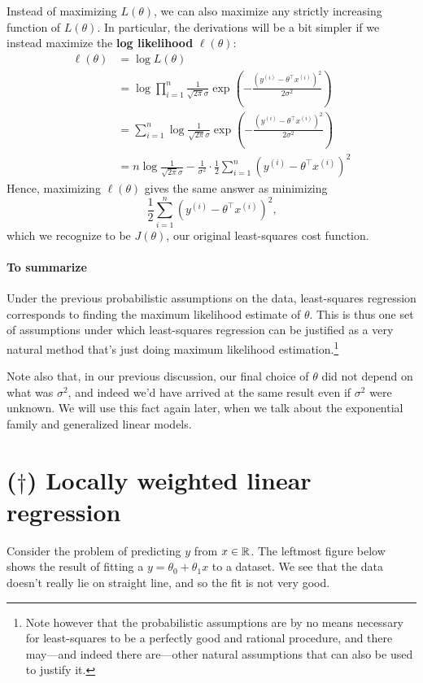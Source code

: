 Instead of maximizing $L(\theta)$, we can also maximize any strictly increasing
function of $L(\theta)$. In particular, the derivations will be a bit simpler if we
instead maximize the \textbf{log likelihood} $\ell(\theta)$:
\begin{align*}
    \ell(\theta) &= \log L(\theta) \\
    &= \log \prod_{i=1}^n \frac{1}{\sqrt{2\pi}\sigma} \exp \left( - \frac{(y^{(i)} - \theta^\top x^{(i)})^2}{2\sigma^2} \right) \\
    &= \sum_{i=1}^n \log \frac{1}{\sqrt{2\pi}\sigma} \exp \left( - \frac{(y^{(i)} - \theta^\top x^{(i)})^2}{2\sigma^2} \right) \\
    &= n \log \frac{1}{\sqrt{2\pi}\sigma} - \frac{1}{\sigma^2} \cdot \frac{1}{2} \sum_{i=1}^n \left(y^{(i)} - \theta^\top x^{(i)} \right)^2 %
\end{align*}
Hence, maximizing $\ell(\theta)$ gives the same answer as minimizing
\begin{equation*}
    \frac 1 2 \sum_{i=1}^n \left( y^{(i)} - \theta^\top x^{(i)} \right)^2\text{,}
\end{equation*}
which we recognize to be $J(\theta)$, our original least-squares cost function.

\paragraph{To summarize} Under the previous probabilistic assumptions on the data,
least-squares regression corresponds to finding the maximum likelihood estimate
of $\theta$. This is thus one set of assumptions under which least-squares regression
can be justified as a very natural method that's just doing maximum
likelihood estimation.\footnote{Note however that the probabilistic assumptions are
by no means necessary for least-squares to be a perfectly good and rational
procedure, and there may---and indeed there are---other natural assumptions
that can also be used to justify it.} %

Note also that, in our previous discussion, our final choice of $\theta$ did not
depend on what was $\sigma^2$, and indeed we'd have arrived at the same result
even if $\sigma^2$ were unknown. We will use this fact again later, when we talk
about the exponential family and generalized linear models.


\section{($\dagger$) Locally weighted linear regression}
Consider the problem of predicting $y$ from $x \in \mathbb{R}$. The leftmost figure below
shows the result of fitting a $y = \theta_0 + \theta_1 x$ to a dataset. We see that the data
doesn't really lie on straight line, and so the fit is not very good.

